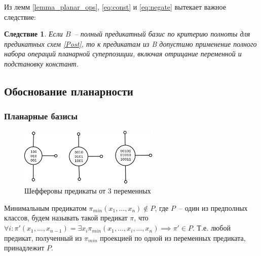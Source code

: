 \documentclass[12pt]{article}
\newtheorem{corollary}[theorem]{Следствие}
\newenvironment{definition}[1][Определение]{\begin{trivlist}
\item[\hskip \labelsep {\bfseries #1}]}{\end{trivlist}}
\begin{document}
Из лемм \ref{lemma_planar_ops}, \ref{eq:const} и \ref{eq:negate} вытекает важное следствие:
\begin{corollary}
\label{can_use_ops}
Если $B$~-- полный предикатный базис по критерию полноты для предикатных схем
\ref{Post}, то к предикатам из B допустимо применение полного набора операций 
планарной суперпозиции, включая отрицание переменной и подстановку констант.
\end{corollary}

\subsection{Обоснование планарности}
\label{planar_chapter}
\subsubsection{Планарные базисы}

\begin{figure}[htb]
\centering
\includegraphics[width=0.6\textwidth]{scheff3.png}
\caption{Шефферовы предикаты от 3 переменных}
\label{fig:sheff}
\end{figure}

\label{planar_basis}

\begin{definition}
Минимальным предикатом $\pi_{min}(x_1, \dots, x_n) \notin P$, где $P$~-- один из предполных классов, будем называть такой 
предикат $\pi$, что $\forall i: \pi'(x_1, \dots, x_{n-1}) = \exists x_i \pi_{min}(x_1, \dots, x_{i}, \dots, x_n) \implies \pi' \in P$. 
Т.е. любой предикат,
полученный из $\pi_{min}$ проекцией по одной из переменных предиката, принадлежит $P$.
\end{definition}
\end{document}

